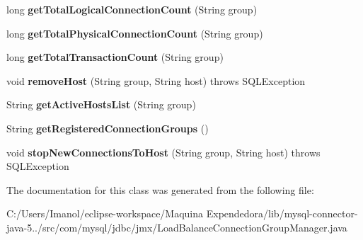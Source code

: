 \begin{DoxyCompactItemize}
long {\bfseries get\+Total\+Logical\+Connection\+Count} (String group)
\item 
\mbox{\label{classcom_1_1mysql_1_1jdbc_1_1jmx_1_1_load_balance_connection_group_manager_a303df19512a48841a7169bdf9444e949}} 
long {\bfseries get\+Total\+Physical\+Connection\+Count} (String group)
\item 
\mbox{\label{classcom_1_1mysql_1_1jdbc_1_1jmx_1_1_load_balance_connection_group_manager_a39a5910d1dd26d0424f20841a5743d4f}} 
long {\bfseries get\+Total\+Transaction\+Count} (String group)
\item 
\mbox{\label{classcom_1_1mysql_1_1jdbc_1_1jmx_1_1_load_balance_connection_group_manager_af58d23a3ed6c9916bf49675ada273a53}} 
void {\bfseries remove\+Host} (String group, String host)  throws S\+Q\+L\+Exception 
\item 
\mbox{\label{classcom_1_1mysql_1_1jdbc_1_1jmx_1_1_load_balance_connection_group_manager_a999888bf9fb6df29ffd7c475346285ba}} 
String {\bfseries get\+Active\+Hosts\+List} (String group)
\item 
\mbox{\label{classcom_1_1mysql_1_1jdbc_1_1jmx_1_1_load_balance_connection_group_manager_aa8430942c0fba976402041f59405e59a}} 
String {\bfseries get\+Registered\+Connection\+Groups} ()
\item 
\mbox{\label{classcom_1_1mysql_1_1jdbc_1_1jmx_1_1_load_balance_connection_group_manager_ab7666a0a92ae0107e0ebe9e912a0b1bc}} 
void {\bfseries stop\+New\+Connections\+To\+Host} (String group, String host)  throws S\+Q\+L\+Exception 
\end{DoxyCompactItemize}


The documentation for this class was generated from the following file\+:\begin{DoxyCompactItemize}
\item 
C\+:/\+Users/\+Imanol/eclipse-\/workspace/\+Maquina Expendedora/lib/mysql-\/connector-\/java-\/5../src/com/mysql/jdbc/jmx/Load\+Balance\+Connection\+Group\+Manager.\+java\end{DoxyCompactItemize}
